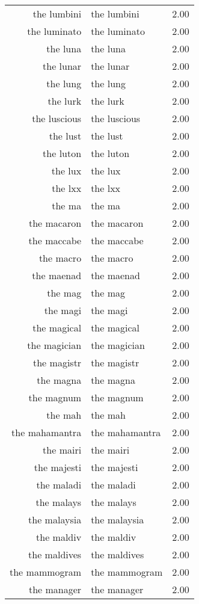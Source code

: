 \begin{table}[ht]
\begin{tabular}{rlr}
  the lumbini & the lumbini & 2.00 \\ 
  the luminato & the luminato & 2.00 \\ 
  the luna & the luna & 2.00 \\ 
  the lunar & the lunar & 2.00 \\ 
  the lung & the lung & 2.00 \\ 
  the lurk & the lurk & 2.00 \\ 
  the luscious & the luscious & 2.00 \\ 
  the lust & the lust & 2.00 \\ 
  the luton & the luton & 2.00 \\ 
  the lux & the lux & 2.00 \\ 
  the lxx & the lxx & 2.00 \\ 
  the ma & the ma & 2.00 \\ 
  the macaron & the macaron & 2.00 \\ 
  the maccabe & the maccabe & 2.00 \\ 
  the macro & the macro & 2.00 \\ 
  the maenad & the maenad & 2.00 \\ 
  the mag & the mag & 2.00 \\ 
  the magi & the magi & 2.00 \\ 
  the magical & the magical & 2.00 \\ 
  the magician & the magician & 2.00 \\ 
  the magistr & the magistr & 2.00 \\ 
  the magna & the magna & 2.00 \\ 
  the magnum & the magnum & 2.00 \\ 
  the mah & the mah & 2.00 \\ 
  the mahamantra & the mahamantra & 2.00 \\ 
  the mairi & the mairi & 2.00 \\ 
  the majesti & the majesti & 2.00 \\ 
  the maladi & the maladi & 2.00 \\ 
  the malays & the malays & 2.00 \\ 
  the malaysia & the malaysia & 2.00 \\ 
  the maldiv & the maldiv & 2.00 \\ 
  the maldives & the maldives & 2.00 \\ 
  the mammogram & the mammogram & 2.00 \\ 
  the manager & the manager & 2.00 \\ 

\end{tabular}
\end{table}
